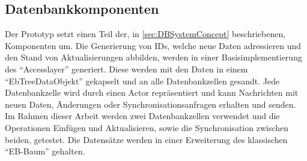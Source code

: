\documentclass[a4paper,11pt,oneside,%
headsepline,												%
footsepline,												%
bibtotocnumbered									%
]{scrreprt}
\begin{document}
\subsection{Datenbankkomponenten}
Der Prototyp setzt einen Teil der, in \autoref{sec:DBSystemConcept} beschriebenen, Komponenten um. Die Generierung von IDs, welche neue Daten adressieren und den Stand von Aktualisierungen abbilden, werden in einer Basisimplementierung des \enquote{Accesslayer} generiert. Diese werden mit den Daten in einem \enquote{EbTreeDataObjekt} gekapselt und an alle Datenbankzellen gesandt. Jede Datenbankzelle wird durch einen Actor repräsentiert und kann Nachrichten mit neuen Daten, Änderungen oder Synchronisationsanfragen erhalten und senden. Im Rahmen dieser Arbeit werden zwei Datenbankzellen verwendet und die Operationen Einfügen und Aktualisieren, sowie die Synchronisation zwischen beiden, getestet. Die Datensätze werden in einer Erweiterung des klassischen \enquote{EB-Baum} gehalten.
\end{document}
